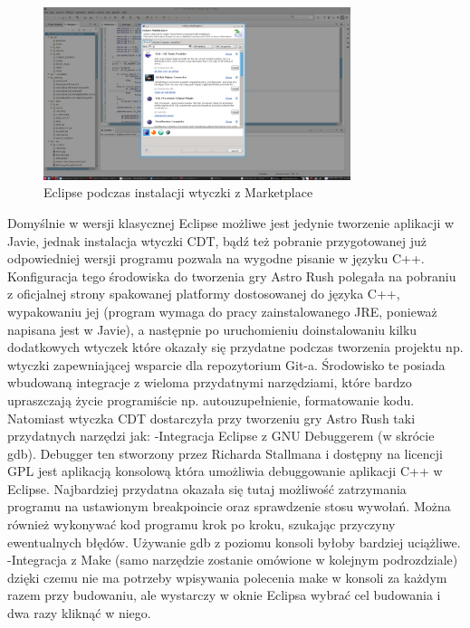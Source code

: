 \begin{figure}[h]
    \centering
    \includegraphics[width=0.8\textwidth,natwidth=480,natheight=142]{./Pictures/eclipse.png}
    \caption{Eclipse podczas instalacji wtyczki z Marketplace}
\end{figure}

Domyślnie w wersji klasycznej Eclipse możliwe jest jedynie tworzenie aplikacji w Javie, jednak instalacja wtyczki CDT, bądź też pobranie przygotowanej już odpowiedniej wersji programu pozwala na wygodne pisanie w języku C++.
Konfiguracja tego środowiska do tworzenia gry Astro Rush polegała na pobraniu z oficjalnej strony spakowanej platformy dostosowanej do języka C++, wypakowaniu jej (program wymaga do pracy zainstalowanego JRE, ponieważ napisana jest w Javie), a następnie po uruchomieniu doinstalowaniu kilku dodatkowych wtyczek które okazały się przydatne podczas tworzenia projektu np. wtyczki zapewniającej wsparcie dla repozytorium Git-a. Środowisko te posiada wbudowaną integracje z wieloma przydatnymi narzędziami, które bardzo upraszczają życie programiście np. autouzupełnienie, formatowanie kodu. Natomiast wtyczka CDT dostarczyła przy tworzeniu gry Astro Rush taki przydatnych narzędzi jak:
-Integracja Eclipse z GNU Debuggerem (w skrócie gdb). Debugger ten stworzony przez Richarda Stallmana i dostępny na licencji GPL jest aplikacją konsolową która umożliwia debuggowanie aplikacji C++ w Eclipse. Najbardziej przydatna okazała się tutaj możliwość zatrzymania programu na ustawionym breakpoincie oraz sprawdzenie stosu wywołań. Można również wykonywać kod programu krok po kroku, szukając przyczyny ewentualnych błędów. Używanie gdb z poziomu konsoli byłoby bardziej uciążliwe. 
-Integracja z Make (samo narzędzie zostanie omówione w kolejnym podrozdziale) dzięki czemu nie ma potrzeby wpisywania polecenia make w konsoli za każdym razem przy budowaniu, ale wystarczy w oknie Eclipsa wybrać cel budowania i dwa razy kliknąć w niego.

